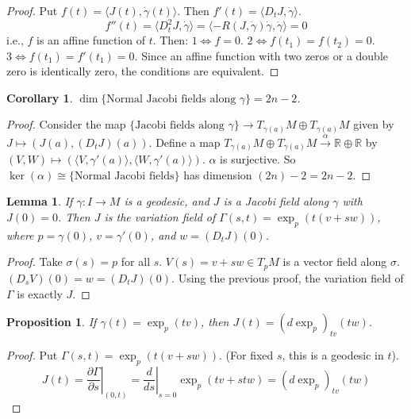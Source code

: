 \documentclass[11pt, a4paper]{article}
\theoremstyle{plain}
\newtheorem{lemma}[theorem]{Lemma}
\newtheorem{proposition}[theorem]{Proposition}
\newtheorem{corollary}[theorem]{Corollary}
\theoremstyle{definition}
\theoremstyle{remark}
\begin{document}
{\begin{proof}
Put $f(t) = \langle J(t), \dot{\gamma}(t) \rangle$. Then $f'(t) = \langle D_t J, \dot{\gamma} \rangle$.
\[ f''(t) = \langle D_t^2 J, \dot{\gamma} \rangle = \langle -R(J, \dot{\gamma})\dot{\gamma}, \dot{\gamma} \rangle = 0 \]
i.e., $f$ is an affine function of $t$. Then:
$1 \iff f = 0$.
$2 \iff f(t_1) = f(t_2) = 0$.
$3 \iff f(t_1) = f'(t_1) = 0$.
Since an affine function with two zeros or a double zero is identically zero, the conditions are equivalent.
\end{proof}

\begin{corollary}
$\dim \{ \text{Normal Jacobi fields along } \gamma \} = 2n-2$.
\end{corollary}

\begin{proof}
Consider the map $\{ \text{Jacobi fields along } \gamma \} \to T_{\gamma(a)}M \oplus T_{\gamma(a)}M$ given by $J \mapsto (J(a), (D_t J)(a))$.
Define a map $T_{\gamma(a)}M \oplus T_{\gamma(a)}M \xrightarrow{\alpha} \mathbb{R} \oplus \mathbb{R}$ by $(V,W) \mapsto (\langle V, \gamma'(a) \rangle, \langle W, \gamma'(a) \rangle)$.
$\alpha$ is surjective. So $\ker(\alpha) \cong \{ \text{Normal Jacobi fields} \}$ has dimension $(2n) - 2 = 2n-2$.
\end{proof}

\begin{lemma}
If $\gamma : I \to M$ is a geodesic, and $J$ is a Jacobi field along $\gamma$ with $J(0) = 0$. Then $J$ is the variation field of $\Gamma(s,t) = \exp_p(t(v+sw))$, where $p = \gamma(0)$, $v = \gamma'(0)$, and $w = (D_t J)(0)$.
\end{lemma}

\begin{proof}
Take $\sigma(s) = p$ for all $s$. $V(s) = v + sw \in T_pM$ is a vector field along $\sigma$.
$(D_s V)(0) = w = (D_t J)(0)$. Using the previous proof, the variation field of $\Gamma$ is exactly $J$.
\end{proof}

\begin{proposition}
If $\gamma(t) = \exp_p(tv)$, then $J(t) = (d\exp_p)_{tv}(tw)$.
\end{proposition}

\begin{proof}
Put $\Gamma(s,t) = \exp_p(t(v+sw))$. (For fixed $s$, this is a geodesic in $t$).
\[ J(t) = \left. \frac{\partial \Gamma}{\partial s} \right|_{(0,t)} = \left. \frac{d}{ds} \right|_{s=0} \exp_p(tv+stw) = (d\exp_p)_{tv}(tw) \]
\end{proof}
}
\end{document}
